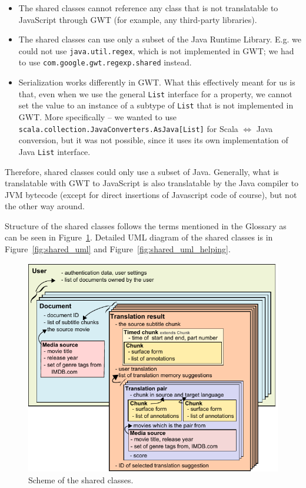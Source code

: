 \begin{itemize}
\item The shared classes cannot reference any class that is not translatable to JavaScript through GWT (for example, any third-party libraries).
\item The shared classes can use only a subset of the Java Runtime Library. E.g. we could not use \texttt{java.util.regex}, which is not implemented in GWT; we had to use \texttt{com.google.gwt.regexp.shared} instead.
\item Serialization works differently in GWT. What this effectively meant for us is that, even when we use the general \texttt{List} interface for a property, we cannot set the value to an instance of a subtype of \texttt{List} that is not implemented in GWT. More specifically -- we wanted to use \texttt{scala.collection.JavaConverters.AsJava[List]} for Scala $\Leftrightarrow$ Java conversion, but it was not possible, since it uses its own implementation of Java \texttt{List} interface.
\end{itemize}

Therefore, shared classes could only use a subset of Java. Generally, what is translatable with GWT to JavaScript is also translatable by the Java compiler to JVM bytecode (except for direct insertions of Javascript code of course), but not the other way around.

Structure of the shared classes follows the terms mentioned in the Glossary as can be seen in Figure~\ref{projectStructure:logical}. Detailed UML diagram of the shared classes is in Figure~\ref{fig:shared_uml} and Figure~\ref{fig:shared_uml_helping}.


\begin{figure}[h]
\begin{center}
\includegraphics{figures/shared_classes.pdf}
\end{center}
\caption{Scheme of the shared classes.}\label{projectStructure:logical}
\end{figure}

